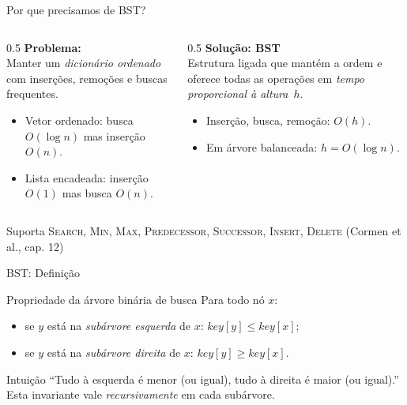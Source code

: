 \documentclass[aspectratio=169]{beamer}
\begin{document}
\begin{frame}{Por que precisamos de BST?}
\begin{columns}[T]
\begin{column}{0.5\textwidth}
\textbf{Problema:}\\[2pt]
Manter um \emph{dicionário ordenado} com inserções,
remoções e buscas frequentes.

\begin{itemize}
  \item \alert{Vetor ordenado:} busca $O(\log n)$ \alert{mas} inserção $O(n)$.
  \item \alert{Lista encadeada:} inserção $O(1)$ \alert{mas} busca $O(n)$.
\end{itemize}
\end{column}
\begin{column}{0.5\textwidth}
\textbf{Solução: BST}\\[2pt]
Estrutura ligada que mantém a ordem
e oferece todas as operações em \emph{tempo proporcional à altura}~$h$.
\begin{itemize}
  \item Inserção, busca, remoção: $O(h)$.
  \item Em árvore balanceada: $h = O(\log n)$.
\end{itemize}
\end{column}
\end{columns}
\vspace{6pt}
\begin{block}{Suporta}
\textsc{Search, Min, Max, Predecessor, Successor, Insert, Delete}
\hfill\tiny{(Cormen et al., cap. 12)}
\end{block}
\end{frame}

\begin{frame}{BST: Definição}
\begin{block}{Propriedade da árvore binária de busca}
Para todo nó $x$:
\begin{itemize}
  \item se $y$ está na \emph{subárvore esquerda} de $x$: $\mathit{key}[y] \le \mathit{key}[x]$;
  \item se $y$ está na \emph{subárvore direita}  de $x$: $\mathit{key}[y] \ge \mathit{key}[x]$.
\end{itemize}
\end{block}
\begin{exampleblock}{Intuição}
``Tudo à esquerda é menor (ou igual), tudo à direita é maior (ou igual).''
Esta invariante vale \emph{recursivamente} em cada subárvore.
\end{exampleblock}
\end{frame}
\end{document}
